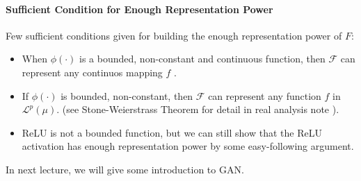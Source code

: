 \paragraph{Sufficient Condition for Enough Representation Power}
Few sufficient conditions given for building the enough representation power of $F$:
\begin{itemize}
\item
When $\phi(\cdot)$ is a bounded, non-constant and continuous function, then $\mathcal{F}$ can represent any continuos mapping $f$  \citep{Hornik1991}.
\item
If $\phi(\cdot)$ is bounded, non-constant,
then $\mathcal{F}$ can represent any function $f$ in $\mathcal{L}^p(\mu)$. (see Stone-Weierstrass Theorem for detail in real analysis note \citep{jiewang2019}).
\item
ReLU is not a bounded function, but we can still show that the ReLU activation has enough representation power by some easy-following argument.
\end{itemize}

In next lecture, we will give some introduction to GAN.












